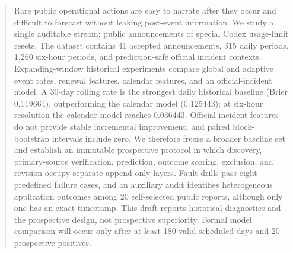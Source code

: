\begin{abstract}
Rare public operational actions are easy to narrate after they occur and difficult to forecast
without leaking post-event information. We study a single auditable stream: public announcements of
special Codex usage-limit resets. The dataset contains 41 accepted announcements, 315 daily periods,
1,260 six-hour periods, and prediction-safe official incident contexts. Expanding-window historical
experiments compare global and adaptive event rates, renewal features, calendar features, and an
official-incident model. A 30-day rolling rate is the strongest daily historical baseline
(Brier 0.119664), outperforming the calendar model (0.125443); at six-hour resolution the calendar
model reaches 0.036443. Official-incident features do not provide stable incremental improvement,
and paired block-bootstrap intervals include zero. We therefore freeze a broader baseline set and establish an immutable prospective
protocol in which discovery, primary-source verification, prediction, outcome scoring, exclusion,
and revision occupy separate append-only layers. Fault drills pass eight predefined failure cases,
and an auxiliary audit identifies heterogeneous application outcomes among 20 self-selected public
reports, although only one has an exact timestamp. This draft reports historical diagnostics and the
prospective design, not prospective superiority. Formal model comparison will occur only after at
least 180 valid scheduled days and 20 prospective positives.
\end{abstract}
